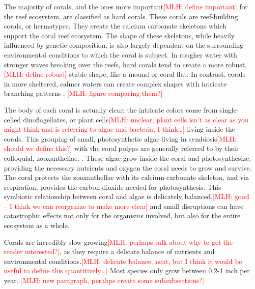 \documentclass{book}\usepackage{knitr}
\newcommand{\red}[1]{\textcolor{red}{[MLH: #1]}}
\begin{document}
\begin{knitrout}
\begin{kframe}
{The majority of corals, and the ones more important\red{define important} for the reef ecosystem, are classified as hard corals. These corals are reef-building corals, or hermatypes. They create the calcium carbonate skeletons which support the coral reef ecosystem. The shape of these skeletons, while heavily influenced by genetic composition, is also largely dependent on the surrounding environmental conditions to which the coral is subject. In rougher water with stronger waves breaking over the reefs, hard corals tend to create a more robust,\red{define robust} stable shape, like a mound or coral flat. In contrast, corals in more sheltered, calmer waters can create complex shapes with intricate branching patterns \citep{coralreefalliance_2021}.  \red{figure comparing them?}

The body of each coral is actually clear; the intricate colors come from single-celled dinoflagellates, or plant cells\red{unclear, plant cells isn't as clear as you might think and is referring to algae and bacteria, I think\ldots} living inside the corals. This grouping of small, photosynthetic algae living in symbiosis\red{should we define this?} with the coral polyps are generally referred to by their colloquial, zooxanthellae. \citep{noaa}. These algae grow inside the coral and photosynthesize, providing the necessary nutrients and oxygen the coral needs to grow and survive. The coral protects the zooxanthellae with its calcium-carbonate skeleton, and via respiration, provides the carbon-dioxide needed for photosynthesis. This symbiotic relationship between coral and algae is delicately balanced,\red{good -- I think we can reorganize to make more clear} and small disruptions can have catastrophic effects not only for the organisms involved, but also for the entire ecosystem as a whole. \citep{https://doi.org/10.1002/fee.2088}  

Corals are incredibly slow growing\red{perhaps talk about why to get the reader interested?}, as they require a delicate balance of nutrients and environmental conditions.\red{delicate balance, neat, but I think it would be useful to define this quantitively\ldots} Most species only grow between 0.2-1 inch per year. \red{new paragraph, perahps create some subsubsections?}

}
\end{kframe}
\end{knitrout}
\end{document}
